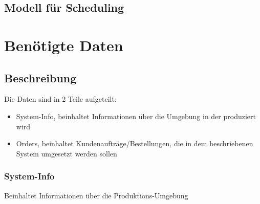 \documentclass[a4paper,12pt,twoside]{scrreprt}
\begin{document}
\cleardoublepage   %
\thispagestyle{empty}
\begin{titlepage}
  \begin{flushleft}
  \section*{Modell für Scheduling}
  
  \end{flushleft}
\end{titlepage}

\newpage
\section*{Benötigte Daten}
\subsection*{Beschreibung}
Die Daten sind in 2 Teile aufgeteilt:
\begin{itemize}
	\item System-Info, beinhaltet Informationen über die Umgebung in der produziert wird
	\item Orders, beinhaltet Kundenaufträge/Bestellungen, die in dem beschriebenen System umgesetzt werden sollen
\end{itemize}
\subsubsection*{System-Info}
Beinhaltet Informationen über die Produktions-Umgebung
\end{document}
